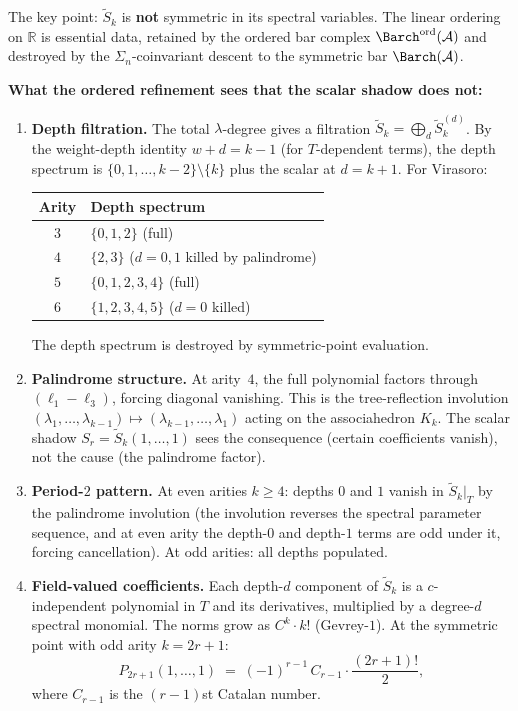 \documentclass[11pt]{article}
\newcommand{\cA}{\mathcal{A}}
\newcommand{\R}{\mathbb{R}}
\begin{document}
The key point: $\widetilde{S}_k$ is \textbf{not} symmetric in its
spectral variables.  The linear ordering on $\R$ is
essential data, retained by the ordered bar complex
$\Barch^{\mathrm{ord}}(\cA)$ and destroyed by the
$\Sigma_n$-coinvariant descent to the symmetric bar
$\Barch(\cA)$.

\medskip
\textbf{What the ordered refinement sees that the scalar shadow
does not:}

\begin{enumerate}[label=\textbf{(\roman*)},leftmargin=2.5em]

\item \textbf{Depth filtration.}
The total $\lambda$-degree gives a filtration
$\widetilde{S}_k = \bigoplus_d \widetilde{S}_k^{(d)}$.
By the weight-depth identity $w + d = k - 1$
(for $T$-dependent terms), the depth spectrum is
$\{0, 1, \ldots, k-2\} \setminus \{k\}$ plus the scalar
at $d = k + 1$.  For Virasoro:
\begin{center}
\small
\begin{tabular}{@{}cl@{}}
Arity & Depth spectrum \\
\hline
$3$ & $\{0, 1, 2\}$ (full) \\
$4$ & $\{2, 3\}$ ($d = 0, 1$ killed by palindrome) \\
$5$ & $\{0, 1, 2, 3, 4\}$ (full) \\
$6$ & $\{1, 2, 3, 4, 5\}$ ($d = 0$ killed)
\end{tabular}
\end{center}
The depth spectrum is destroyed by symmetric-point evaluation.

\item \textbf{Palindrome structure.}
At arity~$4$, the full polynomial factors through
$(\ell_1 - \ell_3)$, forcing diagonal vanishing.  This is the
tree-reflection involution
$(\lambda_1, \ldots, \lambda_{k-1}) \mapsto
(\lambda_{k-1}, \ldots, \lambda_1)$
acting on the associahedron $K_k$.  The scalar shadow
$S_r = \widetilde{S}_k(1, \ldots, 1)$ sees the consequence
(certain coefficients vanish), not the cause (the palindrome
factor).

\item \textbf{Period-$2$ pattern.}
At even arities $k \ge 4$: depths $0$ and $1$ vanish in
$\widetilde{S}_k|_T$ by the palindrome involution (the
involution reverses the spectral parameter sequence, and at
even arity the depth-$0$ and depth-$1$ terms are odd under
it, forcing cancellation).  At odd arities: all depths
populated.

\item \textbf{Field-valued coefficients.}
Each depth-$d$ component of $\widetilde{S}_k$ is a
$c$-independent polynomial in $T$ and its derivatives,
multiplied by a degree-$d$ spectral monomial.  The norms
grow as $C^k \cdot k!$ (Gevrey-$1$).  At the symmetric point
with odd arity $k = 2r + 1$:
\[
P_{2r+1}(1, \ldots, 1)
\;=\;
(-1)^{r-1}\, C_{r-1} \cdot \frac{(2r+1)!}{2},
\]
where $C_{r-1}$ is the $(r-1)$st Catalan number.


\end{enumerate}
\end{document}
